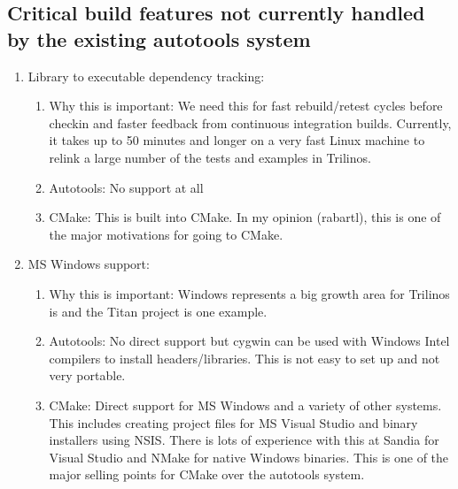 \documentclass[pdf,ps2pdf,11pt]{SANDreport}
\begin{document}
%
{}\subsection{Critical build features not currently handled by the
existing autotools system}
%

\begin{enumerate}

{}\item Library to executable dependency tracking:

  \begin{enumerate}

  {}\item Why this is important: We need this for fast rebuild/retest
  cycles before checkin and faster feedback from continuous
  integration builds.  Currently, it takes up to 50 minutes and longer
  on a very fast Linux machine to relink a large number of the tests
  and examples in Trilinos.

  {}\item Autotools: No support at all

  {}\item CMake: This is built into CMake.  In my opinion (rabartl),
  this is one of the major motivations for going to CMake.

  \end{enumerate}

{}\item MS Windows support:

  \begin{enumerate}

  {}\item Why this is important: Windows represents a big growth area
  for Trilinos is and the Titan project is one example.

  {}\item Autotools: No direct support but cygwin can be used with
  Windows Intel compilers to install headers/libraries.  This is not
  easy to set up and not very portable.

  {}\item CMake: Direct support for MS Windows and a variety of other
  systems.  This includes creating project files for MS Visual Studio
  and binary installers using NSIS.  There is lots of experience with
  this at Sandia for Visual Studio and NMake for native Windows
  binaries.  This is one of the major selling points for CMake over
  the autotools system.

  \end{enumerate}


\end{enumerate}
\end{document}
